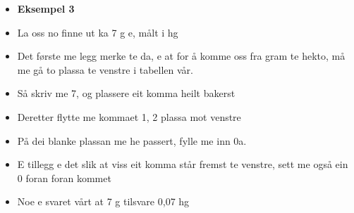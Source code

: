 \begin{itemize}
	\item\textbf{ Eksempel 3}
	\item La oss no finne ut ka 7 g e, målt i hg
	\item Det første me legg merke te da, e at for å komme oss fra gram te hekto, må me gå to plassa te venstre i tabellen vår.
	\item Så skriv me 7, og plassere eit komma heilt bakerst
	\item Deretter flytte me kommaet 1, 2 plassa mot venstre
	\item På dei blanke plassan me he passert, fylle me inn 0a. 
	\item E tillegg e det slik at viss eit komma står fremst te venstre, sett me også ein 0 foran foran kommet 
	\item Noe e svaret vårt at 7 g tilsvare 0,07 hg
\end{itemize}

